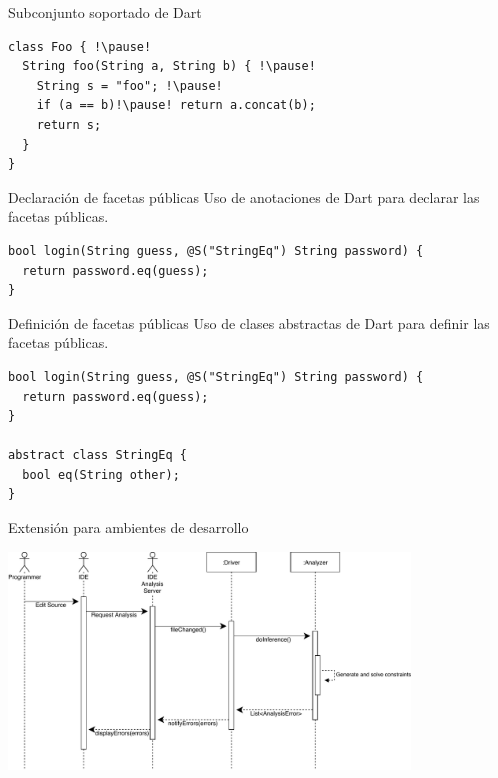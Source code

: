 \documentclass[aspectratio=169,10pt]{beamer}
\begin{document}
\begin{frame}[fragile]{Subconjunto soportado de Dart}
	\begin{center}
	\begin{lstlisting}[escapechar=!,basicstyle=\fontsize{9}{11}\ttfamily]
class Foo { !\pause!
  String foo(String a, String b) { !\pause!
    String s = "foo"; !\pause!
    if (a == b)!\pause! return a.concat(b);
    return s;
  }
}
  \end{lstlisting}
	\end{center}
\end{frame}

\begin{frame}[fragile]{Declaración de facetas públicas}
	Uso de anotaciones de Dart para declarar las facetas públicas. \\ \pause
	\vspace{1cm}
\begin{lstlisting}[escapechar=?,basicstyle=\fontsize{9}{9}\ttfamily]
bool login(String guess, @S("StringEq") String password) {
  return password.eq(guess);
}
\end{lstlisting}
\end{frame}

\begin{frame}[fragile]{Definición de facetas públicas}
	Uso de clases abstractas de Dart para definir las facetas públicas. \\ \pause
	\vspace{1cm}
\begin{lstlisting}[escapechar=?,basicstyle=\fontsize{9}{9}\ttfamily]
bool login(String guess, @S("StringEq") String password) {
  return password.eq(guess);
}

abstract class StringEq {
  bool eq(String other);
}
\end{lstlisting}
\end{frame}

\begin{frame}[fragile]{Extensión para ambientes de desarrollo}
	\begin{center}
		\includegraphics[width=0.8\textwidth]{images/sequence.pdf}
	\end{center}
\end{frame}
\end{document}

